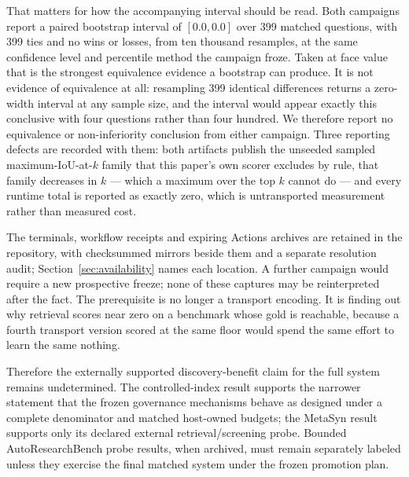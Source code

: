 That matters for how the accompanying interval should be read.  Both campaigns
report a paired bootstrap interval of $[0.0, 0.0]$ over 399 matched
questions, with 399 ties and no wins or losses, from ten thousand resamples, at
the same confidence level and percentile method the campaign froze.  Taken
at face value that is the strongest equivalence evidence a bootstrap can
produce.  It is not evidence of equivalence at all: resampling 399 identical
differences returns a zero-width interval at any sample size, and the interval
would appear exactly this conclusive with four questions rather than four
hundred.  We therefore report no equivalence or non-inferiority conclusion from
either campaign.  Three reporting defects are recorded with them: both artifacts
publish the unseeded sampled maximum-IoU-at-$k$ family that this paper's
own scorer excludes by rule, that family decreases in $k$ --- which a maximum
over the top $k$ cannot do --- and every runtime total is reported as exactly
zero, which is untransported measurement rather than measured cost.

The terminals, workflow receipts and expiring Actions archives are retained in
the repository, with checksummed mirrors beside them and a separate resolution
audit; Section~\ref{sec:availability} names each location.  A further campaign
would require a new prospective
freeze; none of these captures may be reinterpreted after the fact.  The
prerequisite is no longer a transport encoding.  It is finding out why retrieval
scores near zero on a benchmark whose gold is reachable, because a fourth
transport version scored at the same floor would spend the same effort to learn
the same nothing.

Therefore the externally supported discovery-benefit claim for the full system
remains undetermined.  The controlled-index result supports the narrower
statement that the frozen governance mechanisms behave as designed under a
complete denominator and matched host-owned budgets; the MetaSyn result supports
only its declared external retrieval/screening probe.  Bounded AutoResearchBench
probe results, when archived, must remain separately labeled unless they exercise
the final matched system under the frozen promotion plan.
